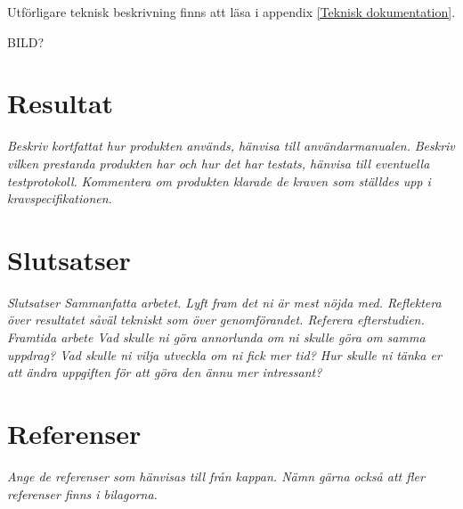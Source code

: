\documentclass[11pt]{article}
\begin{document}
\begin{flushleft}
Utförligare teknisk beskrivning finns att läsa i appendix \ref{Teknisk dokumentation}. 

BILD?

\pagebreak

\section{Resultat}
\textit{Beskriv kortfattat hur produkten används, hänvisa till användarmanualen.}
\textit{Beskriv vilken prestanda produkten har och hur det har testats, hänvisa till eventuella testprotokoll.}
\textit{Kommentera om produkten klarade de kraven som ställdes upp i kravspecifikationen. }

\pagebreak

\section{Slutsatser}
\textit{Slutsatser
Sammanfatta arbetet. 
Lyft fram det ni är mest nöjda med.
Reflektera över resultatet såväl tekniskt som över genomförandet. Referera efterstudien.}
\textit{Framtida arbete
Vad skulle ni göra annorlunda om ni skulle göra om samma uppdrag?
Vad skulle ni vilja utveckla om ni fick mer tid?
Hur skulle ni tänka er att ändra uppgiften för att göra den ännu mer intressant?}

\pagebreak

\section{Referenser}
\textit{Ange de referenser som hänvisas till från kappan. Nämn gärna också att fler referenser finns i bilagorna.}

\pagebreak
{}
%
%

\pagebreak


\appendix

\end{flushleft}
\end{document}
